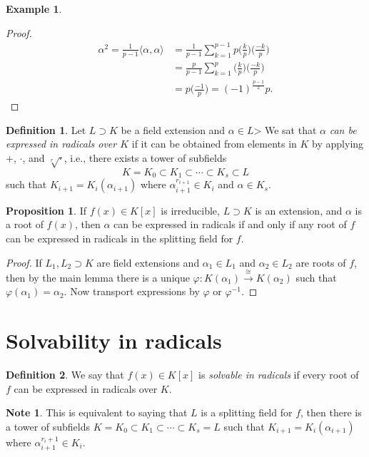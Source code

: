 \documentclass[10pt,letterpaper,cm]{nupset}
\theoremstyle{definition}
\newtheorem*{definition}{Definition}
\newtheorem{exmp}{Example}
\newtheorem{note}{Note}
\newtheorem{prop}{Proposition}
\newcommand{\1}{\mathbf{1}}
\newcommand{\0}{\vec 0}
\begin{document}
\begin{exmp}
\begin{enumerate}
\begin{proof}
\begin{align*}
 \alpha^2 = \frac{1}{p-1} \langle \alpha, \alpha \rangle & = \frac{1}{p-1} \sum_{k=1}^{p-1} p \big (\frac{k}{p} \big) \big (\frac{{-}k}{p} \big) \\ &= \frac{p}{p-1} \sum_{k=1}^{p} \big (\frac{k}{p} \big) \big (\frac{{-}k}{p} \big) \\ & = p \big (\frac{{-}1}{p} \big ) = ({-}1)^{\frac{p-1}{2}}p
. \end{align*}
\end{proof}
\end{enumerate}
\end{exmp}

\begin{definition}
Let $L \supset K$ be a field extension and $\alpha \in L$> We sat that $\alpha$ \textit{can be expressed in radicals over $K$} if it can be obtained from elements in $K$ by applying $+$, $\cdot$, and $\sqrt[r]{\cdot}$, i.e., there exists a tower of subfields $$ K = K_0 \subset K_1 \subset \cdots \subset K_s \subset L  $$ such that $K_{i+1} = K_i(\alpha_{i+1})$ where $\alpha_{i+1}^{r_{i+1}} \in K_i$ and $\alpha \in K_s$. 
\end{definition}

\begin{prop}
If $f(x) \in K[x]$ is irreducible, $L \supset K$ is an extension, and $\alpha$ is a root of $f(x)$, then $\alpha$ can be expressed in radicals if and only if any root of $f$ can be expressed in radicals in the splitting field for $f$.
\end{prop}
\begin{proof}
If $L_1, L_2 \supset K$ are field extensions and $\alpha_1 \in L_1$ and $\alpha_2 \in L_2$ are roots of $f$, then by the main lemma there is a unique $\varphi : K(\alpha_1) \overset{\cong}{\longrightarrow} K(\alpha_2)$ such that $\varphi(\alpha_1) = \alpha_2$. Now transport expressions by $\varphi$ or $\varphi^{-1}$.
\end{proof}

\section{Solvability in radicals}

\begin{definition}
We say that $f(x) \in K[x]$ is \textit{solvable in radicals} if every root of $f$ can be expressed in radicals over $K$.
\end{definition}

\begin{note}
This is equivalent to saying that $L$ is a splitting field for $f$, then there is a tower of subfields $K=K_0 \subset K_1 \subset \cdots \subset K_s =L$ such that $K_{i+1} = K_i(\alpha_{i+1})$ where $\alpha_{i+1}^{r_i+1} \in K_i$.
\end{note}
\end{document}
